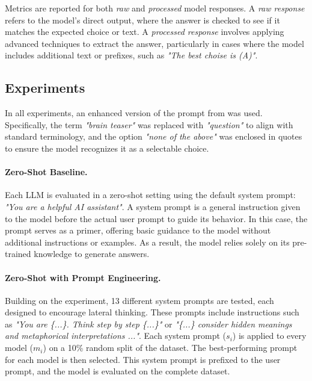 Metrics are reported for both \textit{raw} and \textit{processed} model responses. A \textit{raw response} refers to the model's direct output, where the answer is checked to see if it matches the expected choice or text. A \textit{processed response} involves applying advanced techniques to extract the answer, particularly in cases where the model includes additional text or prefixes, such as \textit{"The best choise is (A)"}.

\subsection{Experiments}

In all experiments, an enhanced version of the prompt from \textcite{jiangBRAINTEASERLateralThinking2023} was used. Specifically, the term \textit{"brain teaser"} was replaced with \textit{"question"} to align with standard terminology, and the option \textit{"none of the above"} was enclosed in quotes to ensure the model recognizes it as a selectable choice.

\paragraph{Zero-Shot Baseline.}
\label{zero-shot-prompt}
Each \ac{LLM} is evaluated in a zero-shot setting using the default system prompt: \textit{"You are a helpful AI assistant"}. A system prompt is a general instruction given to the model before the actual user prompt to guide its behavior. In this case, the prompt serves as a primer, offering basic guidance to the model without additional instructions or examples. As a result, the model relies solely on its pre-trained knowledge to generate answers.

\paragraph{Zero-Shot with Prompt Engineering.}
\label{zero-shot-prompt-engineering}
Building on the  experiment, 13 different system prompts are tested, each designed to encourage lateral thinking. These prompts include instructions such as \textit{"You are \{...\}. Think step by step \{...\}"} or \textit{"\{...\} consider hidden meanings and metaphorical interpretations {...}"}. Each system prompt ($s_i$) is applied to every model ($m_i$) on a 10\% random split of the dataset. The best-performing prompt for each model is then selected. This system prompt is prefixed to the user prompt, and the model is evaluated on the complete dataset.


